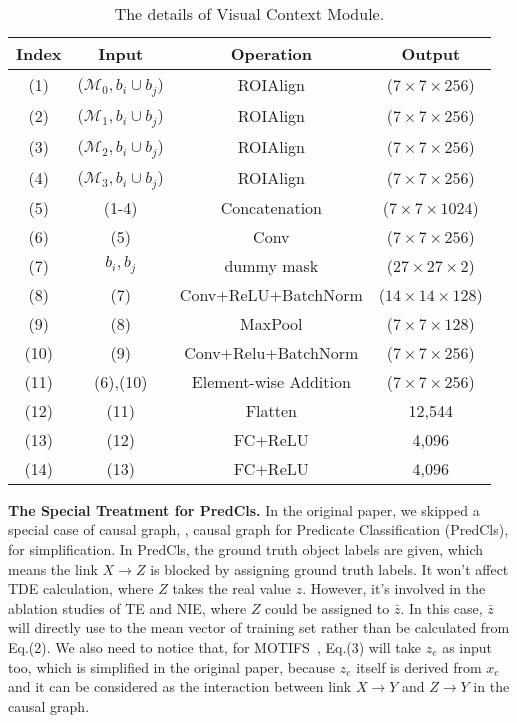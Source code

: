 \documentclass[10pt,twocolumn,letterpaper]{article}
\begin{document}
\begin{table}
\centering
\scalebox{0.8}
{
\begin{tabular}{| c | c | c | c |}
\hline
Index & Input & Operation & Output \\
\hline 
(1) & ($\mathcal{M}_0, b_i \cup b_j$) & ROIAlign & ($7\times 7\times 256$) \\
\hline 
(2) & ($\mathcal{M}_1, b_i \cup b_j$) & ROIAlign & ($7\times 7\times 256$) \\
\hline 
(3) & ($\mathcal{M}_2, b_i \cup b_j$) & ROIAlign & ($7\times 7\times 256$) \\
\hline 
(4) & ($\mathcal{M}_3, b_i \cup b_j$) & ROIAlign & ($7\times 7\times 256$) \\
\hline
(5) & (1-4) & Concatenation & ($7\times 7\times 1024$) \\
\hline
(6) & (5) & Conv & ($7\times 7\times 256$) \\
\hline
(7) & $b_i, b_j$ & dummy mask & ($27\times 27\times 2$) \\
\hline
(8) & (7) & Conv+ReLU+BatchNorm & ($14\times 14\times 128$) \\
\hline
(9) & (8) & MaxPool & ($7\times 7\times 128$) \\
\hline
(10) & (9) & Conv+Relu+BatchNorm & ($7\times 7\times 256$) \\
\hline
(11) & (6),(10) & Element-wise Addition & ($7\times 7\times 256$) \\
\hline
(12) & (11) & Flatten & 12,544 \\
\hline
(13) & (12) & FC+ReLU & 4,096 \\
\hline
(14) & (13) & FC+ReLU & 4,096 \\
\hline
\end{tabular}
}
\caption{The details of Visual Context Module.}
\label{supp_tab:1}
\end{table}

\noindent\textbf{The Special Treatment for PredCls.} In the original paper, we skipped a special case of causal graph, \ie, causal graph for Predicate Classification (PredCls), for simplification. In PredCls, the ground truth object labels are given, which means the link $X\to Z$ is blocked by assigning ground truth labels. It won't affect TDE calculation, where $Z$ takes the real value $z$. However, it's involved in the ablation studies of TE and NIE, where $Z$ could be assigned to $\bar{z}$. In this case, $\bar{z}$ will directly use to the mean vector of training set rather than be calculated from Eq.(2). We also need to notice that, for MOTIFS~\cite{zellers2018neural}, Eq.(3) will take $z_e$ as input too, which is simplified in the original paper, because $z_e$ itself is derived from $x_e$ and it can be considered as the interaction between link $X\to Y$ and $Z\to Y$ in the causal graph.
\end{document}
